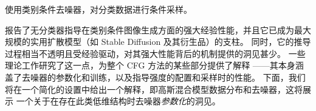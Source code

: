 \documentclass[../../book-main.tex]{subfiles}
\begin{document}
\begin{algorithm}
  \caption{使用类别条件去噪器，对分类数据进行条件采样。}
	\label{alg:iterative_denoising_conditional_CFG}
	\begin{algorithmic}[1]
		 
		\EndFor
		\EndFunction
	\end{algorithmic}
\end{algorithm}

\textcite{Ho2022-ry} 报告了无分类器指导在类别条件图像生成方面的强大经验性能，并且它已成为最大规模的实用扩散模型（如 Stable Diffusion \cite{rombach2022high} 及其衍生品）的支柱。
同时，它的推导过程相当不透明且受经验驱动，对其强大性能背后的机制提供的洞见甚少。
一些理论工作研究了这一点，为整个 CFG 方法的某些部分提供了解释 \cite{Bradley2024-jg,Li2025-li,Wu2024-js}——其本身涵盖了去噪器的参数化和训练，以及指导强度的配置和采样时的性能。
下面，我们将在一个简化的设置中给出一个解释，即高斯混合模型数据分布和去噪器，这将展示 %
一个关于在存在此类低维结构时去噪器\textit{参数化}的洞见。
\end{document}
